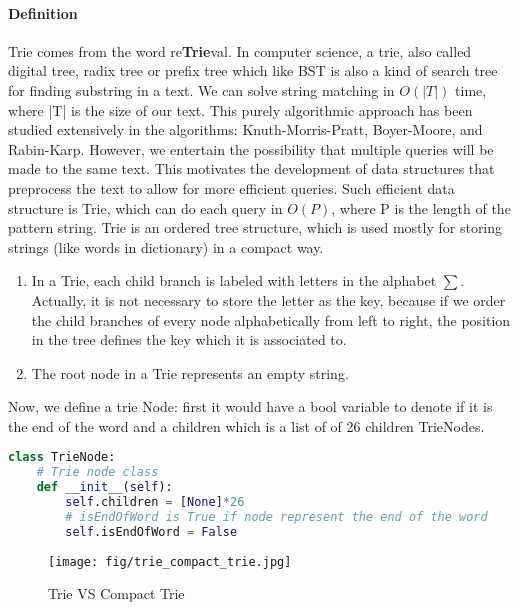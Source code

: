 \documentclass[../main.tex]{subfiles}
\begin{document}
\paragraph{Definition} Trie comes from the word re\textbf{Trie}val. In computer science, a trie, also called digital tree, radix tree or prefix tree which like BST is also a kind of search tree for finding substring in a text. We can solve string matching in $O(|T|)$ time,  where |T| is the size of our text.  This purely algorithmic approach has been studied extensively in the algorithms:  Knuth-Morris-Pratt, Boyer-Moore, and Rabin-Karp. However, we entertain the possibility that multiple queries will be made to the same text.  This motivates the development of data structures that preprocess the text to allow for more efficient queries. Such efficient data structure is Trie, which can do each query in $O(P)$, where P is the length of the pattern string. Trie is an ordered tree structure, which is used mostly for storing strings (like words in dictionary) in a compact way. 
\begin{enumerate}
    \item In a Trie, each child branch is labeled with letters in the alphabet $\sum$. Actually, it is not necessary to store the letter as the key, because if we  order the child branches of every node alphabetically from left to right, the position in the tree defines the key which it is associated to. 
    \item The root node in a Trie represents an empty string. 
\end{enumerate}

Now, we define a trie Node: first it would have a bool variable to denote if it is the end of the word and a children which is a list of of 26 children TrieNodes. 
\begin{lstlisting}[language= Python]
class TrieNode:
    # Trie node class
    def __init__(self):
        self.children = [None]*26
        # isEndOfWord is True if node represent the end of the word
        self.isEndOfWord = False
\end{lstlisting}
\begin{figure}[h]
    \centering
    \texttt{[image: fig/trie\_compact\_trie.jpg]}
    \caption{Trie VS Compact Trie}
    \label{fig:trie_compact_trie}
\end{figure}
\end{document}
